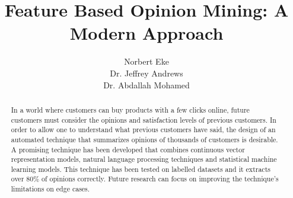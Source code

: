 \documentclass{sig-alternate}
\begin{document}
\title{Feature Based Opinion Mining: A Modern Approach}

\author{
\alignauthor
Norbert Eke\\
\alignauthor Dr. Jeffrey Andrews \\
\alignauthor Dr. Abdallah Mohamed\\
}



\maketitle
\begin{abstract}
In a world where customers can buy products with a few clicks online, future customers must consider the opinions and satisfaction levels of previous customers. In order to allow one to understand what previous customers have said, the design of an automated technique that summarizes opinions of thousands of customers is desirable. A promising technique has been developed that combines continuous vector representation models, natural language processing techniques and statistical machine learning models. This technique has been tested on labelled datasets and it extracts over 80\% of opinions correctly. Future research can focus on improving the technique's limitations on edge cases.
\end{abstract}

\end{document}
